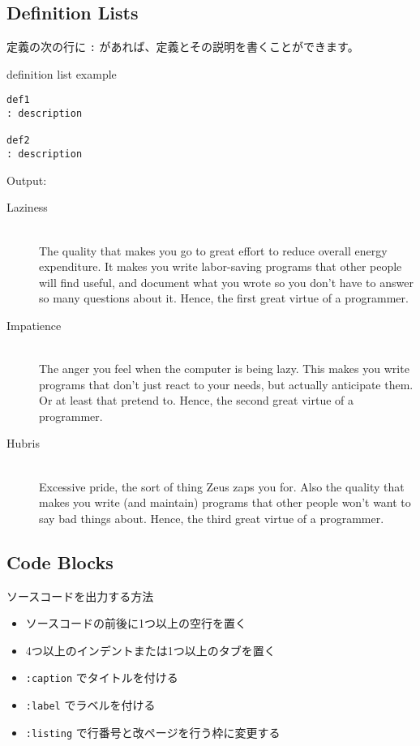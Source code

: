 \documentclass[a4j, titlepage]{jarticle}
\begin{document}
\subsection{Definition Lists}

定義の次の行に {\tt :} があれば、定義とその説明を書くことができます。

\begin{itembox}[c]{definition list example}
\begin{verbatim}
def1
: description

def2
: description
\end{verbatim}
\end{itembox}

Output:

\begin{description}
\item[Laziness]\mbox{}\\ The quality that makes you go to great effort to reduce overall energy expenditure. It makes you write labor-saving programs that other people will find useful, and document what you wrote so you don't have to answer so many questions about it. Hence, the first great virtue of a programmer.



\item[Impatience]\mbox{}\\ The anger you feel when the computer is being lazy. This makes you write programs that don't just react to your needs, but actually anticipate them. Or at least that pretend to. Hence, the second great virtue of a programmer.



\item[Hubris]\mbox{}\\ Excessive pride, the sort of thing Zeus zaps you for. Also the quality that makes you write (and maintain) programs that other people won't want to say bad things about. Hence, the third great virtue of a programmer.
\end{description}

\subsection{Code Blocks}

ソースコードを出力する方法

\begin{itemize}
\item ソースコードの前後に1つ以上の空行を置く
\item 4つ以上のインデントまたは1つ以上のタブを置く
\item {\tt :caption} でタイトルを付ける
\item {\tt :label} でラベルを付ける
\item {\tt :listing} で行番号と改ページを行う枠に変更する
\end{itemize}
\end{document}
